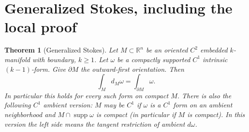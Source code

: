\documentclass[11pt,oneside,openany]{book}
\newtheorem{theorem}{Theorem}[chapter]
\theoremstyle{definition}
\theoremstyle{remark}
\newcommand{\R}{\mathbb R}
\DeclareMathOperator{\supp}{supp}
\newcommand{\family}[1]{}
\begin{document}
\section{Generalized Stokes, including the local proof}
\family{K04.15.06}\family{K04.15.07}
\begin{theorem}[Generalized Stokes]\label{d04:15:stokes}
Let $M\subset\R^n$ be an oriented $C^2$ embedded $k$-manifold with
boundary, $k\ge1$. Let $\omega$ be a compactly supported $C^1$ intrinsic
$(k-1)$-form. Give $\partial M$ the outward-first orientation. Then
\[
 \int_Md_M\omega=\int_{\partial M}\omega.
\]
In particular this holds for every such form on compact $M$.
There is also the following $C^1$ ambient version: $M$ may be $C^1$ if
$\omega$ is a $C^1$ form on an ambient neighborhood and
$M\cap\supp\omega$ is compact (in particular if $M$ is compact). In this
version the left side means the tangent restriction of ambient $d\omega$.
\end{theorem}
\end{document}

